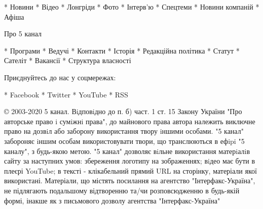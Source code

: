 * Новини
* Відео
* Лонгріди
* Фото
* Інтерв'ю
* Спецтеми
* Новини компаній
* Афіша

Про 5 канал

* Програми
* Ведучі
* Контакти
* Історія
* Редакційна політика
* Статут
* Сателіт
* Вакансії
* Структура власності

Приєднуйтесь до нас у соцмережах:

* Facebook
* Twitter
* YouTube
* RSS

© 2003-2020 5 канал. Вiдповiдно до п. б) част. 1 ст. 15 Закону України
"Про авторське право i сумiжнi права", до майнового права автора належить
виключне право на дозвiл або заборону використання твору iншими особами.
"5 канал" забороняє iншим особам використовувати твори, що транслюються в
ефipi "5 каналу", з будь-якою метою. "5 канал" дозволяє вiльне
використання матерiалiв сайту за наступних умов: збереження логотипу на
зображеннях; вiдео має бути в плеєрі YouTube; в тексті - клікабельний
прямий URL на сторінку, матеріали якої використані. Матеріали, що містять
посилання на агентство "Інтерфакс-Україна", не підлягають подальшому
відтворенню та/чи розповсюдженню в будь-якій формі, інакше як з письмового
дозволу агентства "Інтерфакс-Україна"

